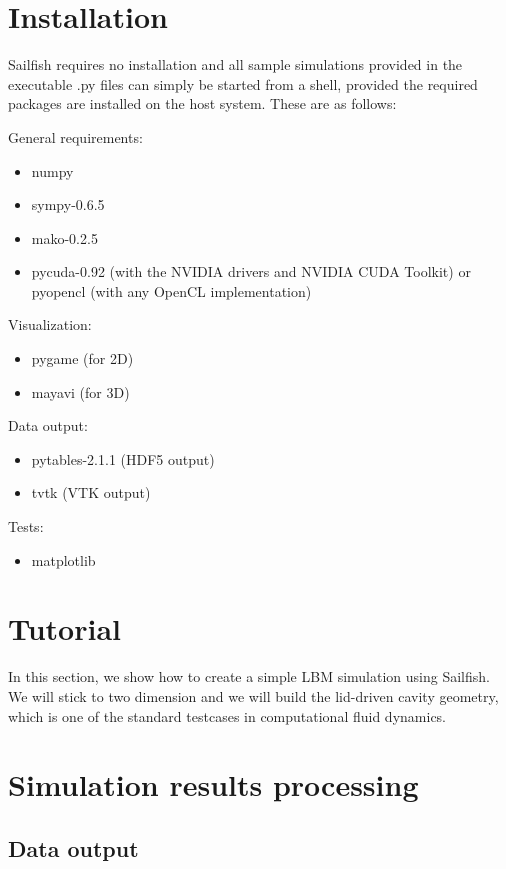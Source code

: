 \documentclass{article}
\begin{document}
\section{Installation}

Sailfish requires no installation and all sample simulations provided in the executable
.py files can simply be started from a shell, provided the required packages are
installed on the host system.  These are as follows:

General requirements:
\begin{itemize}
	\item numpy
	\item sympy-0.6.5
	\item mako-0.2.5
	\item pycuda-0.92 (with the NVIDIA drivers and NVIDIA CUDA Toolkit) or
		pyopencl (with any OpenCL implementation)
\end{itemize}

Visualization:
\begin{itemize}
	\item pygame (for 2D)
	\item mayavi (for 3D)
\end{itemize}

Data output:
\begin{itemize}
	\item pytables-2.1.1 (HDF5 output)
	\item tvtk (VTK output)
\end{itemize}

Tests:
\begin{itemize}
	\item matplotlib
\end{itemize}

\section{Tutorial}

In this section, we show how to create a simple LBM simulation using Sailfish.
We will stick to two dimension and we will build the lid-driven cavity geometry,
which is one of the standard testcases in computational fluid dynamics.

\section{Simulation results processing}

\subsection{Data output}
\end{document}

